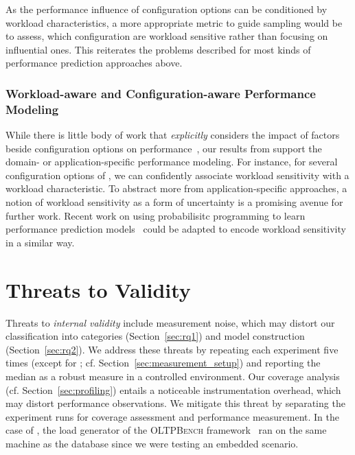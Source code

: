 {{{\begin{table}
\end{table}

}

As the performance influence of configuration options can be conditioned by workload characteristics, a more appropriate metric to guide sampling would be to assess, which configuration are workload sensitive rather than focusing on influential ones. This reiterates the problems described for most kinds of performance prediction approaches above.

\subsubsection{Workload-aware and Configuration-aware Performance Modeling} While there is little body of work that \textit{explicitly} considers the impact of factors beside configuration options on performance~\cite{koc_satune_2021}, our results from  support the domain- or application-specific performance modeling. For instance, for several configuration options of \jumper, we can confidently associate workload sensitivity with a workload characteristic. To abstract more from application-specific approaches, a notion of workload sensitivity as a form of uncertainty is a promising avenue for further work. Recent work on using probabilisitc programming to learn performance prediction models~\cite{dorn2020} could be adapted to encode workload sensitivity in a similar way.

\section{Threats to Validity}\label{sec:threats}
\color{black}
Threats to \textit{internal validity} include measurement noise, which may distort our classification into categories (Section~\ref{sec:rq1}) and model construction (Section~\ref{sec:rq2}). We address these threats by repeating each experiment five times  (except for \htwo; cf. Section~\ref{sec:measurement_setup}) and reporting the median as a robust measure in a controlled environment. Our coverage analysis (cf. Section~\ref{sec:profiling}) entails a noticeable instrumentation overhead, which may distort performance observations. We mitigate this threat by separating the experiment runs for coverage assessment and performance measurement. In the case of \htwo, the load generator of the \textsc{OLTPBench} framework~\cite{difallah_oltp_2013} ran on the same machine as the database since we were testing an embedded scenario. 	
	
}}
